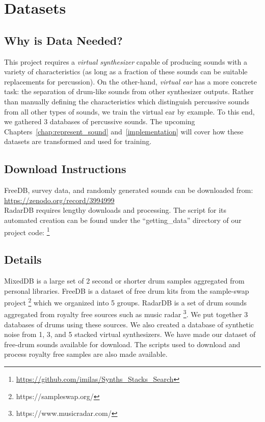 \documentclass[\main/thesis.tex]{subfiles}
\begin{document}
\chapter{Datasets}
\label{sec:datasets}
\section{Why is Data Needed?}
This project requires a \textit{virtual synthesizer} capable of producing sounds with a variety of characteristics (as long as a fraction of these sounds can be suitable replacements for percussion). On the other-hand, \textit{virtual ear} has a more concrete task: the separation of drum-like sounds from other synthesizer outputs. Rather than manually defining the characteristics which distinguish percussive sounds from all other types of sounds, we train the virtual ear by example. To this end, we gathered 3 databases of percussive sounds. The upcoming Chapters~\ref{chap:represent_sound} and~\ref{implementation} will cover how these datasets are transformed and used for training.



\section{Download Instructions}
FreeDB, survey data, and randomly generated sounds can be downloaded from: \url{https://zenodo.org/record/3994999}\\
RadarDB requires lengthy downloads and processing. The script for its automated creation can be found under the \enquote{getting\_data} directory of our project code: \footnote{\url{https://github.com/imilas/Synths_Stacks_Search}}
\section{Details}
MixedDB is a large set of 2 second or shorter drum samples aggregated from personal libraries. FreeDB is a dataset of free drum kits from the sample-swap project \footnote{https://sampleswap.org/} which we organized into 5 groups. RadarDB is a set of drum sounds aggregated from royalty free sources such as music radar \footnote{https://www.musicradar.com/}. We put together 3 databases of drums using these sources. We also created a database of synthetic noise from 1, 3, and 5 stacked virtual synthesizers. We have made our dataset of free-drum sounds available for download. The scripts used to download and process royalty free samples are also made available. 
\end{document}
